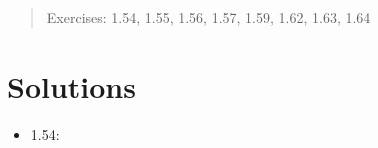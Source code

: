 \documentclass[10pt]{article}
\begin{document}
\maketitle

\begin{abstract}
Exercises: 1.54, 1.55, 1.56, 1.57, 1.59, 1.62, 1.63, 1.64
\end{abstract}
\noindent

\section{Solutions}

\begin{itemize}
\item 1.54: 
\end{itemize}
\end{document}
